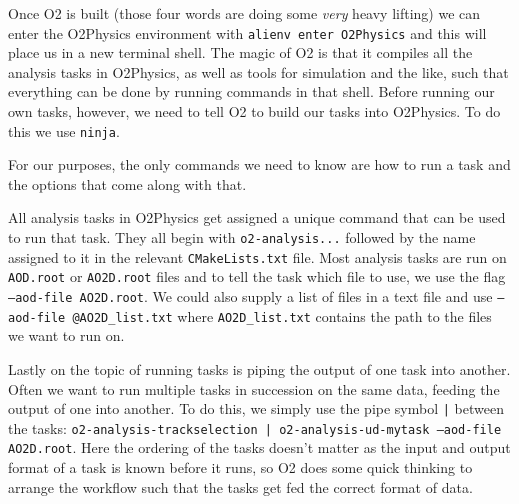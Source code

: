 Once O2 is built (those four words are doing some \textit{very} heavy lifting) we can enter the O2Physics environment with \texttt{alienv enter O2Physics} and this will place us in a new terminal shell. The magic of O2 is that it compiles all the analysis tasks in O2Physics, as well as tools for simulation and the like, such that everything can be done by running commands in that shell. Before running our own tasks, however, we need to tell O2 to build our tasks into O2Physics. To do this we use \texttt{ninja}.




For our purposes, the only commands we need to know are how to run a task and the options that come along with that. 

All analysis tasks in O2Physics get assigned a unique command that can be used to run that task. They all begin with \texttt{o2-analysis...} followed by the name assigned to it in the relevant \texttt{CMakeLists.txt} file. Most analysis tasks are run on \texttt{AOD.root} or \texttt{AO2D.root} files and to tell the task which file to use, we use the flag \texttt{--aod-file AO2D.root}. We could also supply a list of files in a text file and use \texttt{--aod-file @AO2D\_list.txt} where \texttt{AO2D\_list.txt} contains the path to the files we want to run on. 

Lastly on the topic of running tasks is piping the output of one task into another. Often we want to run multiple tasks in succession on the same data, feeding the output of one into another. To do this, we simply use the pipe symbol \texttt{|} between the tasks: \texttt{o2-analysis-trackselection | o2-analysis-ud-mytask --aod-file AO2D.root}. Here the ordering of the tasks doesn't matter as the input and output format of a task is known before it runs, so O2 does some quick thinking to arrange the workflow such that the tasks get fed the correct format of data.
